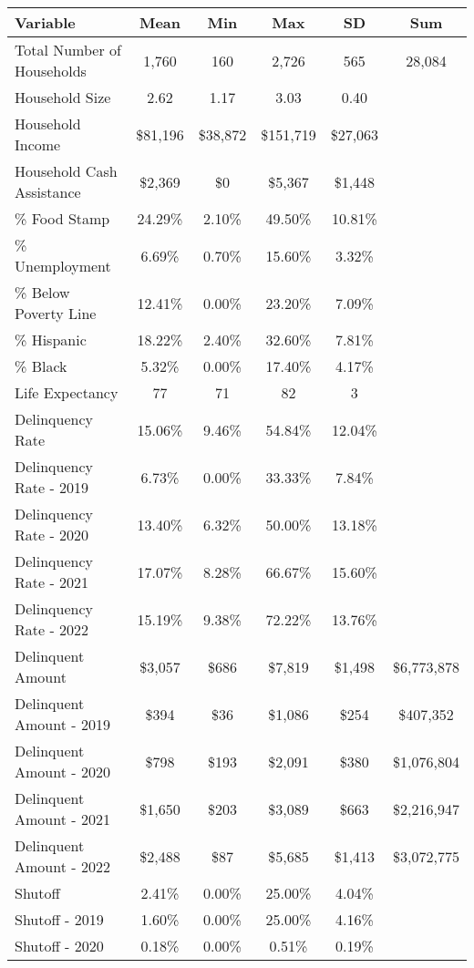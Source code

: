 \begin{tabular}{l|c|c|c|c|c}
\toprule 
\midrule 
Variable & Mean & Min & Max & SD & Sum \\
\midrule 
Total Number of Households & 1,760 & 160 & 2,726 & 565 & 28,084 \\
\quad Household Size & 2.62 & 1.17 & 3.03 & 0.40 \\
Household Income & \$81,196 & \$38,872 & \$151,719 & \$27,063 \\
\quad Household Cash Assistance & \$2,369 & \$0 & \$5,367 & \$1,448 \\
\% Food Stamp & 24.29\% & 2.10\% & 49.50\% & 10.81\% \\
\% Unemployment & 6.69\% & 0.70\% & 15.60\% & 3.32\% \\
\% Below Poverty Line & 12.41\% & 0.00\% & 23.20\% & 7.09\% \\
\% Hispanic & 18.22\% & 2.40\% & 32.60\% & 7.81\% \\
\% Black & 5.32\% & 0.00\% & 17.40\% & 4.17\% \\
Life Expectancy & 77 & 71 & 82 & 3 \\
\midrule 
Delinquency Rate & 15.06\% & 9.46\% & 54.84\% & 12.04\% \\
\quad Delinquency Rate - 2019 & 6.73\% & 0.00\% & 33.33\% & 7.84\% \\
\quad Delinquency Rate - 2020 & 13.40\% & 6.32\% & 50.00\% & 13.18\% \\
\quad Delinquency Rate - 2021 & 17.07\% & 8.28\% & 66.67\% & 15.60\% \\
\quad Delinquency Rate - 2022 & 15.19\% & 9.38\% & 72.22\% & 13.76\% \\
\midrule 
Delinquent Amount & \$3,057 & \$686 & \$7,819 & \$1,498 & \$6,773,878 \\
\quad Delinquent Amount - 2019 & \$394 & \$36 & \$1,086 & \$254 & \$407,352 \\
\quad Delinquent Amount - 2020 & \$798 & \$193 & \$2,091 & \$380 & \$1,076,804 \\
\quad Delinquent Amount - 2021 & \$1,650 & \$203 & \$3,089 & \$663 & \$2,216,947 \\
\quad Delinquent Amount - 2022 & \$2,488 & \$87 & \$5,685 & \$1,413 & \$3,072,775 \\
\midrule 
Shutoff & 2.41\% & 0.00\% & 25.00\% & 4.04\% \\
\quad Shutoff - 2019 & 1.60\% & 0.00\% & 25.00\% & 4.16\% \\
\quad Shutoff - 2020 & 0.18\% & 0.00\% & 0.51\% & 0.19\% \\

\end{tabular}

